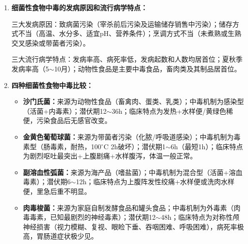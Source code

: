 {\begin{enumerate}[leftmargin=*, itemsep=4pt]
    四大临床发病特点：
    \begin{enumerate}[leftmargin=*]
        \item 潜伏期短、发病突然，短时间内或一二天内有很多人发病，以集体暴发较多见
        \item 发病与食物有关，病人有食用同一有毒食物史，流行波及范围与有毒食物供应范围一致，停止该食物供应后，流行即终止
        \item 患者临床症状相同或相似，大多数食物中毒以急性胃肠炎为主要表现
        \item 一般情况下，人与人之间不直接传染，发病曲线呈突然上升后又迅速下降趋势，无传染病流行时的余波
    \end{enumerate}

    五大流行病学特点：
    \begin{enumerate}[leftmargin=*]
        \item 发病的季节性明显：细菌性食物中毒主要发生在6$\sim$10月，化学性食物中毒全年均可发生
        \item 发病的地区性特点：与各地的食品品种和饮食习惯有关
        \item 食物中毒原因的分布特点：患者只局限于食用同一种食物的人群中
        \item 病死率特点：发病率高，病死率低；死亡人数以有毒动植物食物中毒最多，其次为化学性
        \item 发生场所分布特点：集体暴发常以节假日改善伙食或集餐多见
    \end{enumerate}

    \item \textbf{细菌性食物中毒的发病原因和流行病学特点：}

    三大发病原因：致病菌污染（宰杀前后污染及运输储存销售中污染）；储存方式不当（高温、水分多、适宜pH、营养条件）；烹调方式不当（未煮熟或生熟交叉感染或带菌者污染）。

    三大流行病学特点：发病率高、病死率低，发病起数和人数均居首位；夏秋季发病率高（5$\sim$10月）；动物性食品是主要中毒食品，畜肉类及其制品居首位。

    \item \textbf{四种细菌性食物中毒比较：}
    \begin{itemize}[leftmargin=*]
        \item \textbf{沙门氏菌：}来源为动物性食品（畜禽肉、蛋类、乳类）；中毒机制为感染型（活菌+内毒素）；潜伏期12$\sim$36h；临床特点为发热+水样便/黄绿色稀便，污染食品后无感官改变。
        \item \textbf{金黄色葡萄球菌：}来源为带菌者污染（化脓/呼吸道感染）；中毒机制为毒素型（肠毒素，耐热，100$^\circ$C 2h破坏）；潜伏期1$\sim$6h（最短1h）；临床特点为剧烈呕吐最突出+上腹剧痛+水样腹泻，体温一般正常。
        \item \textbf{副溶血性弧菌：}来源为海产品（嗜盐菌）；中毒机制为混合型（活菌+溶血毒素）；潜伏期6$\sim$12h；临床特点为上腹阵发性绞痛+水样便或洗肉水样便，里急后重不明显。
        \item \textbf{肉毒梭菌：}来源为家庭自制发酵食品和罐头食品；中毒机制为外毒素（肉毒毒素，已知最剧烈的神经毒素）；潜伏期12$\sim$48h；临床特点为对称性颅神经损害（视力模糊、复视、眼睑下垂、吞咽困难、呼吸困难），病死率极高，胃肠道症状极少见。
    \end{itemize}


\end{enumerate}}
